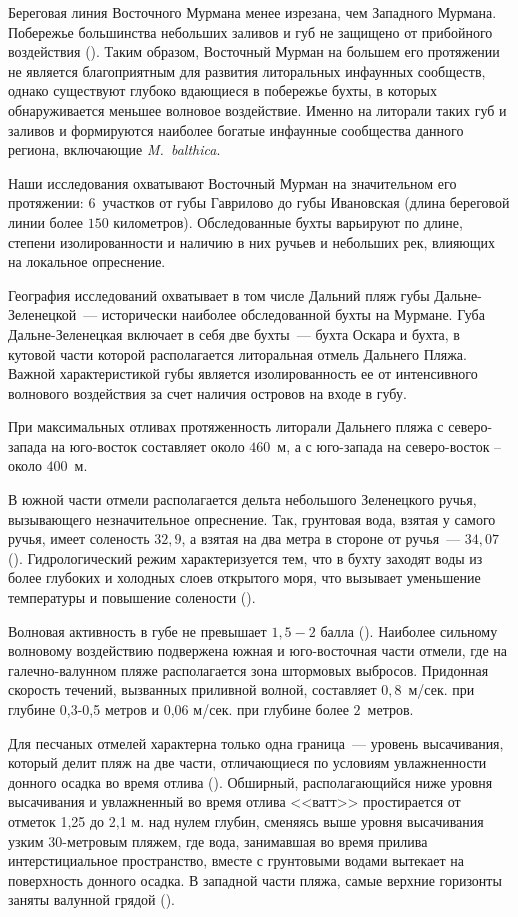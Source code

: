 Береговая линия Восточного Мурмана менее изрезана, чем Западного Мурмана. 
Побережье большинства небольших заливов и губ не защищено от прибойного воздействия (\cite{Guryanova_Ushakov_1929}).
Таким образом, Восточный Мурман на большем его протяжении не является благоприятным для развития литоральных инфаунных сообществ, однако существуют глубоко вдающиеся в побережье бухты, в которых обнаруживается меньшее волновое воздействие. 
Именно на литорали таких губ и заливов и формируются наиболее богатые инфаунные сообщества данного региона, включающие {\it M.~balthica}.

Наши исследования охватывают Восточный Мурман на значительном его протяжении: $6$~участков от губы Гаврилово до губы Ивановская (длина береговой линии более $150$ километров).
Обследованные бухты варьируют по длине, степени изолированности и наличию в них ручьев и небольших рек, влияющих на локальное опреснение.


География исследований охватывает в том числе Дальний пляж губы Дальне-Зеленецкой~--- исторически наиболее обследованной бухты на Мурмане.
Губа Дальне-Зеленецкая включает в себя две бухты~--- бухта Оскара и бухта, в кутовой части которой располагается литоральная отмель Дальнего Пляжа. 
Важной характеристикой губы является изолированность ее от интенсивного волнового воздействия за счет наличия островов на входе в губу.
	
При максимальных отливах протяженность литорали Дальнего пляжа с северо-запада на юго-восток составляет около $460$~м, а с юго-запада на северо-восток -- около $400$~м. 
	
В южной части отмели располагается дельта небольшого Зеленецкого ручья, вызывающего незначительное опреснение. 
Так, грунтовая вода, взятая у самого ручья, имеет соленость $32,9$\permil, а взятая на два метра в стороне от ручья~--- $34,07$\permil (\cite{Prigorovskiy_1948}). 
Гидрологический режим характеризуется тем, что в бухту заходят воды из более глубоких и холодных слоев открытого моря, что вызывает уменьшение температуры и повышение солености (\cite{Voronkov_et_al_1948}).

Волновая активность в губе не превышает $1,5 - 2$ балла (\cite{Alexeev_1976}). 
Наиболее сильному волновому воздействию подвержена южная и юго-восточная части отмели, где на галечно-валунном пляже располагается зона штормовых выбросов.
Придонная скорость течений, вызванных приливной волной, составляет $0,8$~м/сек. при глубине 0,3-0,5 метров и 0,06 м/сек. при глубине более $2$~метров.

Для песчаных отмелей характерна только одна граница~--- уровень высачивания, который делит пляж на две части, отличающиеся по условиям увлажненности донного осадка во время отлива (\cite{Streltsov_Agarova_1978}). 
Обширный, располагающийся ниже уровня высачивания и увлажненный во время отлива <<ватт>> простирается от отметок 1,25 до 2,1 м. над нулем глубин, сменяясь выше уровня высачивания узким $30$-метровым пляжем, где вода, занимавшая во время прилива интерстициальное пространство, вместе с грунтовыми водами вытекает на поверхность донного осадка. 
В западной части пляжа, самые верхние горизонты заняты валунной грядой (\cite{Agarova_et_al_1976}). 

